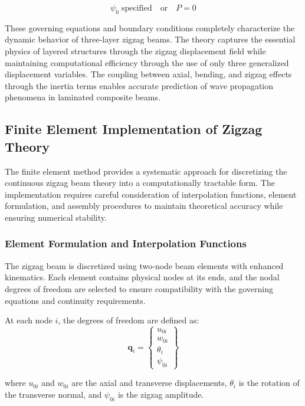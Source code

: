 \documentclass[12pt,a4paper]{report}
\begin{document}
\[
\psi_0 \; \text{specified} \quad \text{or} \quad P = 0
\]

These governing equations and boundary conditions completely characterize the dynamic behavior of three-layer zigzag beams. The theory captures the essential physics of layered structures through the zigzag displacement field while maintaining computational efficiency through the use of only three generalized displacement variables. The coupling between axial, bending, and zigzag effects through the inertia terms enables accurate prediction of wave propagation phenomena in laminated composite beams.

\subsection{Finite Element Implementation of Zigzag Theory}

The finite element method provides a systematic approach for discretizing the continuous zigzag beam theory into a computationally tractable form. The implementation requires careful consideration of interpolation functions, element formulation, and assembly procedures to maintain theoretical accuracy while ensuring numerical stability.



\subsubsection*{Element Formulation and Interpolation Functions}

The zigzag beam is discretized using two-node beam elements with enhanced kinematics. Each element contains physical nodes at its ends, and the nodal degrees of freedom are selected to ensure compatibility with the governing equations and continuity requirements.

At each node $i$, the degrees of freedom are defined as:
\begin{equation}
    \mathbf{q}_i = \begin{Bmatrix} u_{0i} \\ w_{0i} \\ \theta_i \\ \psi_{0i} \end{Bmatrix}
\end{equation}

where $u_{0i}$ and $w_{0i}$ are the axial and transverse displacements, $\theta_i$ is the rotation of the transverse normal, and $\psi_{0i}$ is the zigzag amplitude.
\end{document}

